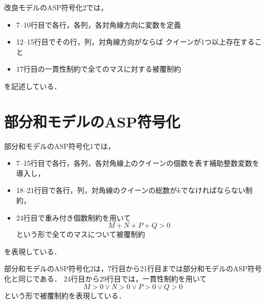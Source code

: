 改良モデルのASP符号化2では，
\begin{itemize}
 \item 7--10行目で各行，各列，各対角線方向に変数を定義
 \item 12--15行目でその行，列，対角線方向がならば
  クイーンが1つ以上存在すること
 \item 17行目の一貫性制約で全てのマスに対する被覆制約
\end{itemize}
を記述している．

\section{部分和モデルのASP符号化}



部分和モデルのASP符号化1では，
\begin{itemize}
 \item 7--15行目で各行，各列，各対角線上のクイーンの個数を表す補助整数変数を導入し，
 \item 18--21行目で各行，列，対角線のクイーンの総数が$k$でなければならない制約， 
 \item 24行目で重み付き個数制約を用いて
	$$M+N+P+Q>0$$
  という形で全てのマスについて被覆制約
\end{itemize}
を表現している．



部分和モデルのASP符号化2は，7行目から21行目までは部分和モデルのASP符号化と同じである．
24行目から29行目では，一貫性制約を用いて
$$M>0 \vee N>0 \vee P>0 \vee Q>0$$
という形で被覆制約を表現している．

